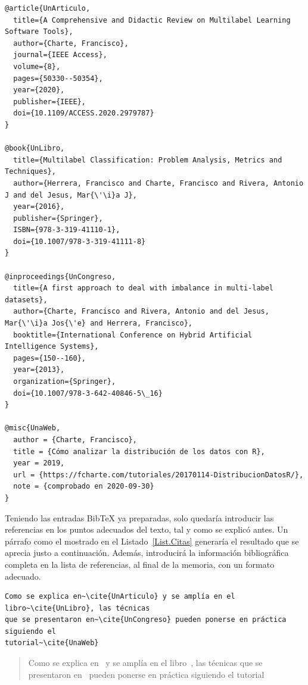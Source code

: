 \begin{lstlisting}[caption={Entradas BibTex de distintos tipos},label=List.BibTeX,language={[LaTeX]TeX}]
@article{UnArticulo,
  title={A Comprehensive and Didactic Review on Multilabel Learning Software Tools},
  author={Charte, Francisco},
  journal={IEEE Access},
  volume={8},
  pages={50330--50354},
  year={2020},
  publisher={IEEE},
  doi={10.1109/ACCESS.2020.2979787}
}

@book{UnLibro,
  title={Multilabel Classification: Problem Analysis, Metrics and Techniques},
  author={Herrera, Francisco and Charte, Francisco and Rivera, Antonio J and del Jesus, Mar{\'\i}a J},
  year={2016},
  publisher={Springer},
  ISBN={978-3-319-41110-1},
  doi={10.1007/978-3-319-41111-8}
}

@inproceedings{UnCongreso,
  title={A first approach to deal with imbalance in multi-label datasets},
  author={Charte, Francisco and Rivera, Antonio and del Jesus, Mar{\'\i}a Jos{\'e} and Herrera, Francisco},
  booktitle={International Conference on Hybrid Artificial Intelligence Systems},
  pages={150--160},
  year={2013},
  organization={Springer},
  doi={10.1007/978-3-642-40846-5\_16}
}

@misc{UnaWeb,
  author = {Charte, Francisco},
  title = {Cómo analizar la distribución de los datos con R},
  year = 2019,
  url = {https://fcharte.com/tutoriales/20170114-DistribucionDatosR/}, 
  note = {comprobado en 2020-09-30}
}
\end{lstlisting}

Teniendo las entradas BibTeX ya preparadas, solo quedaría introducir las referencias en los puntos adecuados del texto, tal y como se explicó antes. Un párrafo como el mostrado en el Listado~\ref{List.Citas} generaría el resultado que se aprecia justo a continuación. Además, introducirá la información bibliográfica completa en la lista de referencias, al final de la memoria, con un formato adecuado.

\begin{lstlisting}[caption={Párrafo en el que se citan varios trabajos},language={[LaTeX]TeX},label=List.Citas]
Como se explica en~\cite{UnArticulo} y se amplía en el libro~\cite{UnLibro}, las técnicas 
que se presentaron en~\cite{UnCongreso} pueden ponerse en práctica siguiendo el 
tutorial~\cite{UnaWeb}
\end{lstlisting}

\begin{quotation}
    Como se explica en~\cite{UnArticulo} y se amplía en el libro~\cite{UnLibro}, las técnicas que se presentaron en~\cite{UnCongreso} pueden ponerse en práctica siguiendo el tutorial~\cite{UnaWeb}
\end{quotation}

